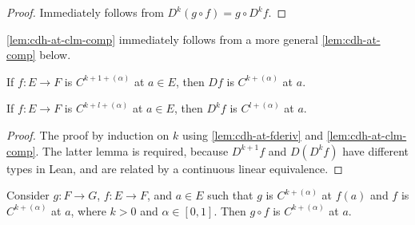 \begin{proof}
  Immediately follows from \(D^{k}(g \circ f) = g\circ D^{k}f\).
\end{proof}

\begin{remark}
  \autoref{lem:cdh-at-clm-comp} immediately follows from a more general \autoref{lem:cdh-at-comp} below.
\end{remark}

\begin{lemma}%
  \label{lem:cdh-at-fderiv}
  If \(f \colon E \to F\) is \(C^{k+1+(\alpha)}\) at \(a \in E\),
  then \(Df\) is \(C^{k+(\alpha)}\) at \(a\).
\end{lemma}

\begin{corollary}%
  \label{lem:cdh-at-iteratedFDeriv}
  If \(f \colon E \to F\) is \(C^{k+l+(\alpha)}\) at \(a \in E\),
  then \(D^{k}f\) is \(C^{l+(\alpha)}\) at \(a\).
\end{corollary}
\begin{proof}
  The proof by induction on \(k\) using \autoref{lem:cdh-at-fderiv} and \autoref{lem:cdh-at-clm-comp}.
  The latter lemma is required, because \(D^{k+1}f\) and \(D(D^{k} f)\) have different types in Lean,
  and are related by a continuous linear equivalence.
\end{proof}

\begin{lemma}%
  \label{lem:cdh-at-comp}
  Consider \(g\colon F \to G\), \(f\colon E \to F\), and \(a \in E\)
  such that \(g\) is \(C^{k+(\alpha)}\) at \(f(a)\) and \(f\) is \(C^{k+(\alpha)}\) at \(a\), where \(k > 0\) and \(\alpha \in [0, 1]\).
  Then \(g\circ f\) is \(C^{k+(\alpha)}\) at \(a\).
\end{lemma}

